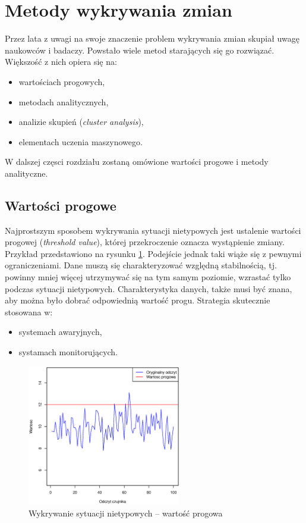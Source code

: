 
\section{Metody wykrywania zmian}
Przez lata z uwagi na swoje znaczenie problem wykrywania zmian skupiał uwagę naukowców i badaczy.
Powstało wiele metod starających się go rozwiązać.
Większość z nich opiera się na:
\begin{itemize}
  \item wartościach progowych,
  \item metodach analitycznych,
  \item analizie skupień (\textit{cluster analysis}),
  \item elementach uczenia maszynowego.
\end{itemize}
W dalszej częsci rozdziału zostaną omówione wartości progowe i metody analityczne.
\subsection{Wartości progowe}
Najprostszym sposobem wykrywania sytuacji nietypowych jest ustalenie wartości progowej (\textit{threshold value}),
której przekroczenie oznacza wystąpienie zmiany.
Przykład przedstawiono na rysunku \ref{fig:SignalThreshold}.
Podejście jednak taki wiąże się z pewnymi ograniczeniami.
Dane muszą się charakteryzować względną stabilnością,
tj. powinny mniej więcej utrzymywać się na tym samym poziomie, wzrastać tylko podczas sytuacji nietypowych.
Charakterystyka danych,
także musi być znana,
aby można było dobrać odpowiednią wartość progu.
Strategia skutecznie stosowana w:
\begin{itemize}
  \item systemach awaryjnych,
  \item systamach monitorujących.
\end{itemize}
\begin{figure}[htbp]
\centering
	\includegraphics[width=0.6\textwidth]{img/ch-2-threshold}
	\caption{Wykrywanie sytuacji nietypowych -- wartość progowa}
  \label{fig:SignalThreshold}
\end{figure}

